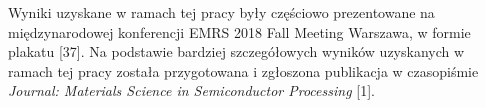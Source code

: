 Wyniki uzyskane w ramach tej pracy były częściowo prezentowane na międzynarodowej konferencji EMRS 2018 Fall Meeting Warszawa, w formie plakatu [37]. Na podstawie bardziej szczegółowych wyników uzyskanych w ramach tej pracy została przygotowana i zgłoszona publikacja w czasopiśmie \textit{Journal: Materials Science in Semiconductor Processing} [1].





